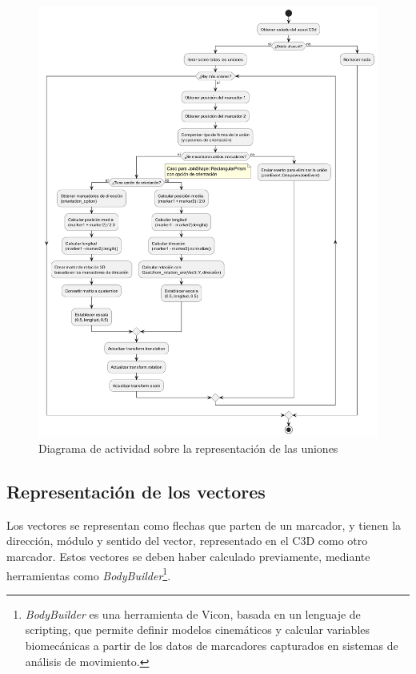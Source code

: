 \begin{figure}[H]
  \centering
  \includegraphics[width=\textwidth]{imagenes/diagramas/uniones.png}
  \caption{Diagrama de actividad sobre la representación de las uniones}
  \label{fig:diag-uniones}
\end{figure}

\subsection{Representación de los vectores} \label{sec:representacion-vectores}

Los vectores se representan como flechas que parten de un marcador, y tienen la dirección, módulo y sentido del vector, representado en el \ac{C3D} como otro marcador. Estos vectores se deben haber calculado previamente, mediante herramientas como \textit{BodyBuilder}\footnote{\textit{BodyBuilder} es una herramienta de Vicon, basada en un lenguaje de scripting, que permite definir modelos cinemáticos y calcular variables biomecánicas a partir de los datos de marcadores capturados en sistemas de análisis de movimiento.}.

